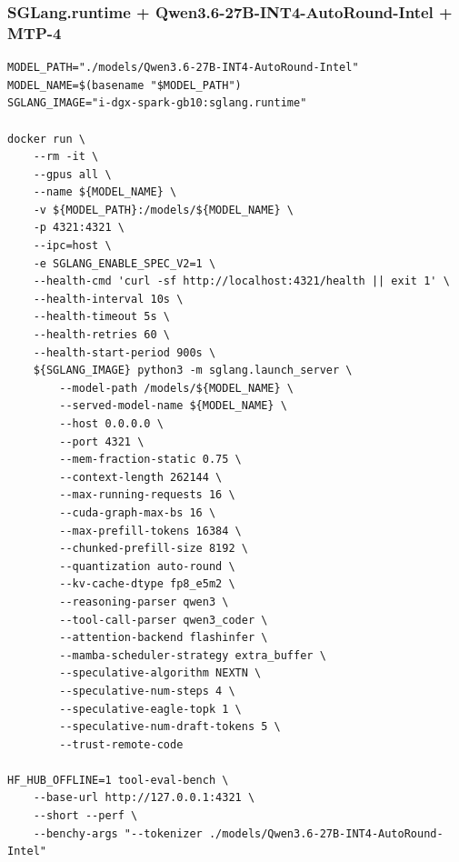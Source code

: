\documentclass{article}
\begin{document}
\subsubsection{SGLang.runtime + Qwen3.6-27B-INT4-AutoRound-Intel + MTP-4}
\begin{lstlisting}
MODEL_PATH="./models/Qwen3.6-27B-INT4-AutoRound-Intel"
MODEL_NAME=$(basename "$MODEL_PATH")
SGLANG_IMAGE="i-dgx-spark-gb10:sglang.runtime"

docker run \
    --rm -it \
    --gpus all \
    --name ${MODEL_NAME} \
    -v ${MODEL_PATH}:/models/${MODEL_NAME} \
    -p 4321:4321 \
    --ipc=host \
    -e SGLANG_ENABLE_SPEC_V2=1 \
    --health-cmd 'curl -sf http://localhost:4321/health || exit 1' \
    --health-interval 10s \
    --health-timeout 5s \
    --health-retries 60 \
    --health-start-period 900s \
    ${SGLANG_IMAGE} python3 -m sglang.launch_server \
        --model-path /models/${MODEL_NAME} \
        --served-model-name ${MODEL_NAME} \
        --host 0.0.0.0 \
        --port 4321 \
        --mem-fraction-static 0.75 \
        --context-length 262144 \
        --max-running-requests 16 \
        --cuda-graph-max-bs 16 \
        --max-prefill-tokens 16384 \
        --chunked-prefill-size 8192 \
        --quantization auto-round \
        --kv-cache-dtype fp8_e5m2 \
        --reasoning-parser qwen3 \
        --tool-call-parser qwen3_coder \
        --attention-backend flashinfer \
        --mamba-scheduler-strategy extra_buffer \
        --speculative-algorithm NEXTN \
        --speculative-num-steps 4 \
        --speculative-eagle-topk 1 \
        --speculative-num-draft-tokens 5 \
        --trust-remote-code

HF_HUB_OFFLINE=1 tool-eval-bench \
    --base-url http://127.0.0.1:4321 \
    --short --perf \
    --benchy-args "--tokenizer ./models/Qwen3.6-27B-INT4-AutoRound-Intel"
\end{lstlisting}
\end{document}
